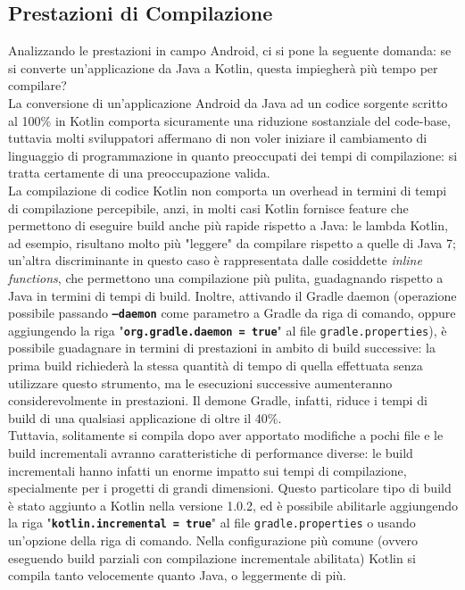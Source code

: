\subsection{Prestazioni di Compilazione}
Analizzando le prestazioni in campo Android, ci si pone la seguente domanda: se si converte un'applicazione da Java a Kotlin, questa impiegherà più tempo per compilare?\\
La conversione di un'applicazione Android da Java ad un codice sorgente scritto al 100\% in Kotlin comporta sicuramente una riduzione sostanziale del code-base, tuttavia molti sviluppatori affermano di non voler iniziare il cambiamento di linguaggio di programmazione in quanto preoccupati dei tempi di compilazione: si tratta certamente di una preoccupazione valida.\\
La compilazione di codice Kotlin non comporta un overhead in termini di tempi di compilazione percepibile, anzi, in molti casi Kotlin fornisce feature che permettono di eseguire build anche più rapide rispetto a Java: le lambda Kotlin, ad esempio, risultano molto più "leggere" da compilare rispetto a quelle di Java 7; un'altra discriminante in questo caso è rappresentata dalle cosiddette {\em inline functions}, che permettono una compilazione più pulita, guadagnando rispetto a Java in termini di tempi di build. Inoltre, attivando il Gradle daemon (operazione possibile passando {\bfseries \texttt{--daemon}} come parametro a Gradle da riga di comando, oppure aggiungendo la riga "{\bfseries \texttt{org.gradle.daemon = true}}" al file \texttt{gradle.properties}), è possibile guadagnare in termini di prestazioni in ambito di build successive: la prima build richiederà la stessa quantità di tempo di quella effettuata senza utilizzare questo strumento, ma le esecuzioni successive aumenteranno considerevolmente in prestazioni. Il demone Gradle, infatti, riduce i tempi di build di una qualsiasi applicazione di oltre il 40\%.\\
Tuttavia, solitamente si compila dopo aver apportato modifiche a pochi file e le build incrementali avranno caratteristiche di performance diverse: le build incrementali hanno infatti un enorme impatto sui tempi di compilazione, specialmente per i progetti di grandi dimensioni.
Questo particolare tipo di build è stato aggiunto a Kotlin nella versione 1.0.2, ed è possibile abilitarle aggiungendo la riga "{\bfseries \texttt{kotlin.incremental = true}}" al file \texttt{gradle.properties} o usando un'opzione della riga di comando. Nella configurazione più comune (ovvero eseguendo build parziali con compilazione incrementale abilitata) Kotlin si compila tanto velocemente quanto Java, o leggermente di più.\\

